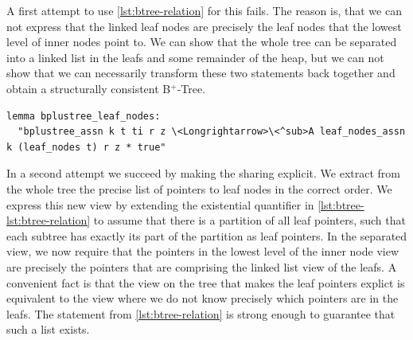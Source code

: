\documentclass[a4paper,UKenglish,cleveref, autoref, thm-restate]{lipics-v2021}
\newcommand{\btree}{B$^+$-Tree}
\begin{document}
A first attempt to use \autoref{lst:btree-relation} for this fails.
The reason is, that we can not express that the linked leaf nodes
are precisely the leaf nodes that the lowest level of inner nodes point to.
We can show that the whole tree can be separated into a linked list in the leafs
and some remainder of the heap, but we can not show that we can necessarily transform
these two statements back together and obtain a structurally consistent \btree.

\begin{lstlisting}[mathescape=true, language=Isabelle,label=lst:btree-view-split-oneway]
lemma bplustree_leaf_nodes:
  "bplustree_assn k t ti r z \<Longrightarrow>\<^sub>A leaf_nodes_assn k (leaf_nodes t) r z * true"
\end{lstlisting}


In a second attempt we succeed by making the sharing explicit.
We extract from the whole tree the precise list of pointers to leaf nodes
in the correct order.
We express this new view by extending the existential quantifier in \autoref{lst:btree-lst:btree-relation}
to assume that there is a partition of all leaf pointers,
such that each subtree has exactly its part of the partition as leaf pointers.
In the separated view, we now require that the pointers
in the lowest level of the inner node view are precisely the pointers
that are comprising the linked list view of the leafs.
A convenient fact is that the view on the tree that makes the leaf pointers explict
is equivalent to the view where we do not know precisely which pointers are in the leafs.
The statement from \autoref{lst:btree-relation} is strong enough to guarantee that such a list exists.
\end{document}
